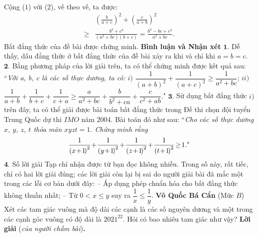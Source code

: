 \begin{multicols}{2}
\begin{align*}
	\end{align*}
	Cộng ($1$) với ($2$), vế theo vế, ta được:
	\begin{align*}
		&{\left( {\frac{b}{{a + c}}} \right)^2} + {\left( {\frac{c}{{a + b}}} \right)^2} \\
		\ge &\frac{{{b^3} + {c^3}}}{{\left( {{a^2} + bc} \right)\left( {b + c} \right)}} = \frac{{{b^2} - bc + {c^2}}}{{{a^2} + bc}}.
	\end{align*}
	Bất đẳng thức của đề bài được chứng minh.
	\vskip 0.05cm
	\textbf{\color{thachthuctoanhoc}Bình luận và Nhận xét}
	\vskip 0.05cm
	$\pmb{1.}$ Dễ thấy, dấu đẳng thức ở bất đẳng thức của đề bài xảy ra khi và chỉ khi $a = b = c$.
	\vskip 0.05cm
	$\pmb{2.}$ Bằng phương pháp của lời giải trên, ta có thể chứng minh được kết quả sau:
	\vskip 0.05cm
	``\textit{Với a, b, c là các số thực dương, ta có:}
	\vskip 0.05cm
	$i)$  $\dfrac{1}{{{{\left( {a + b} \right)}^2}}} + \dfrac{1}{{{{\left( {a + c} \right)}^2}}} \ge \dfrac{1}{{{a^2} + bc}}$;
	\vskip 0.05cm
	$ii)$  $\dfrac{1}{{a + b}} + \dfrac{1}{{b + c}} + \dfrac{1}{{c + a}} \ge \dfrac{a}{{{a^2} + bc}} + \dfrac{b}{{{b^2} + ca}} + \dfrac{c}{{{c^2} + ab}}.$"
	\vskip 0.05cm
	$\pmb{3.}$ Sử dụng bất đẳng thức $i)$ trên đây, ta có thể giải được bài toán bất đẳng thức trong Đề thi chọn đội tuyển Trung Quốc dự thi $IMO$ năm $2004$. Bài toán đó như sau:
	\vskip 0.05cm
	``\textit{Cho các số thực dương $x$, $y$, $z$, $t$ thỏa mãn $xyzt = 1$. Chứng minh rằng}
	\begin{align*}
		\frac{1}{{{{\left( {x \!+\! 1} \!\right)}^2}}} \!+\! \frac{1}{{{{\left( {y \!+\! 1} \!\right)}^2}}} \!+\! \frac{1}{{{{\left( {z \!+\! 1}\! \right)}^2}}} \!+\! \frac{1}{{{{\left( {t \!+\! 1}\! \right)}^2}}} \!\ge\! 1. \text{\color{black}"}
	\end{align*}
	$\pmb{4.}$ Số lời giải Tạp chí nhận được từ bạn đọc không nhiều. Trong số này, rất tiếc, chỉ có hai lời giải đúng; các lời giải còn lại bị sai do người giải bài đã mắc một trong các lỗi cơ bản dưới đây:
	\vskip 0.05cm
	-- Áp dụng phép chuẩn hóa cho bất đẳng thức không thuần nhất;
	\vskip 0.05cm
	-- Từ $0 < x \le y$ suy ra  $\dfrac{1}{x} \le \dfrac{1}{y}$.
	\vskip 0.05cm 
	\hfill \textbf{\color{thachthuctoanhoc}Võ Quốc Bá Cẩn}
	\vskip 0.05cm
	{}
	(Mức $B$) Xét các tam giác vuông mà độ dài các cạnh là các số nguyên dương và một trong các cạnh góc vuông có độ dài là $2021^{22}$. Hỏi có bao nhiêu tam giác như vậy? 
	\vskip 0.05cm
	\textbf{\color{thachthuctoanhoc}Lời giải} (\textit{của người chấm bài})\textbf{\color{thachthuctoanhoc}.}

\end{multicols}
